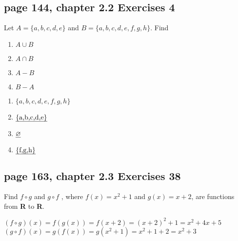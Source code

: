\documentclass[sigconf]{acmart}
\begin{document}
\subsection{page 144, chapter 2.2 Exercises 4}
\begin{shaded}
    Let $A = \{a, b, c, d, e\}$ and $B = \{a, b, c, d, e, f, g, h\}$. Find
    \begin{enumerate}[label=(\alph*)]
    	\item $A \cup B$
    	\item $A \cap B$
    	\item $A - B$
    	\item $B - A$
    \end{enumerate}
\end{shaded}  
\begin{enumerate}[label=(\alph*)]
	\item $\{a, b, c, d, e, f, g, h\}$
	\item $\text{\uline{\{a,b,c,d,e\}}}$
	\item $\uline{\varnothing}$
	\item $\text{\uline{\{f,g,h\}}}$
\end{enumerate}

\subsection{page 163, chapter 2.3 Exercises 38}
\begin{shaded}
    Find $f \circ g$ and $g \circ f$ , where $f(x) = x^2 + 1$ and $g(x) = x + 2$, are functions from \textbf{R} to \textbf{R}.
\end{shaded}  
\uline{$(f \circ g)(x) = f(g(x)) = f(x+2) = (x+2)^2+1 = x^2+4x+5$}\\
\uline{$(g \circ f)(x) = g(f(x)) = g(x^2+1) = x^2+1+2 = x^2+3$}
\end{document}
